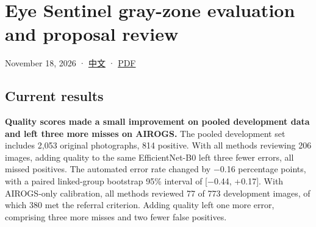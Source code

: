 \documentclass[
  10pt,
]{article}
\author{}
\date{}
\begin{document}
\section{Eye Sentinel gray-zone evaluation and proposal
review}\label{eye-sentinel-gray-zone-evaluation-and-proposal-review}

November 18, 2026 · \href{gray-zone.zh.md}{中文} ·
\href{gray-zone.en.pdf}{PDF}

\subsection{Current results}\label{current-results}

\textbf{Quality scores made a small improvement on pooled development
data and left three more misses on AIROGS.} The pooled development set
includes 2,053 original photographs, 814 positive. With all methods
reviewing 206 images, adding quality to the same EfficientNet-B0 left
three fewer errors, all missed positives. The automated error rate
changed by −0.16 percentage points, with a paired linked-group bootstrap
95\% interval of {[}−0.44, +0.17{]}. With AIROGS-only calibration, all
methods reviewed 77 of 773 development images, of which 380 met the
referral criterion. Adding quality left one more error, comprising three
more misses and two fewer false positives.
\end{document}
